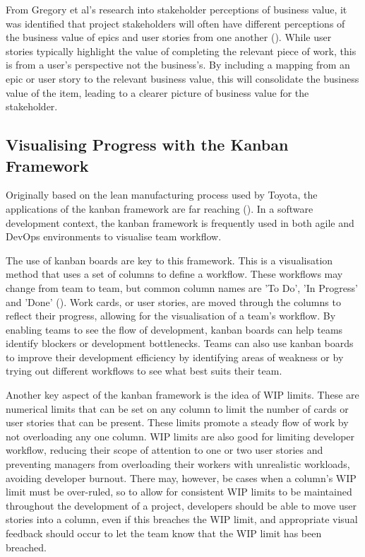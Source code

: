 \documentclass[l4proj.tex]{subfiles}
\begin{document}
From Gregory et al's research into stakeholder perceptions of business value, it was identified that project stakeholders will often have different perceptions of the business value of epics and user stories from one another (\cite{Gregory2020}). While user stories typically highlight the value of completing the relevant piece of work, this is from a user's perspective not the business's. By including a mapping from an epic or user story to the relevant business value, this will consolidate the business value of the item, leading to a clearer picture of business value for the stakeholder.

\subsection{Visualising Progress with the Kanban Framework}
Originally based on the lean manufacturing process used by Toyota, the applications of the kanban framework are far reaching (\cite{Ahmad2018}). In a software development context, the kanban framework is frequently used in both agile and DevOps environments to visualise team workflow. 

The use of kanban boards are key to this framework. This is a visualisation method that uses a set of columns to define a workflow. These workflows may change from team to team, but common column names are 'To Do', 'In Progress' and 'Done' (\cite{RadiganKanban}). Work cards, or user stories, are moved through the columns to reflect their progress, allowing for the visualisation of a team's workflow. By enabling teams to see the flow of development, kanban boards can help teams identify blockers or development bottlenecks. Teams can also use kanban boards to improve their development efficiency by identifying areas of weakness or by trying out different workflows to see what best suits their team. 

Another key aspect of the kanban framework is the idea of WIP limits. These are numerical limits that can be set on any column to limit the number of cards or user stories that can be present. These limits promote a steady flow of work by not overloading any one column. WIP limits are also good for limiting developer workflow, reducing their scope of attention to one or two user stories and preventing managers from overloading their workers with unrealistic workloads, avoiding developer burnout. There may, however, be cases when a column's WIP limit must be over-ruled, so to allow for consistent WIP limits to be maintained throughout the development of a project, developers should be able to move user stories into a column, even if this breaches the WIP limit, and appropriate visual feedback should occur to let the team know that the WIP limit has been breached.
\end{document}
